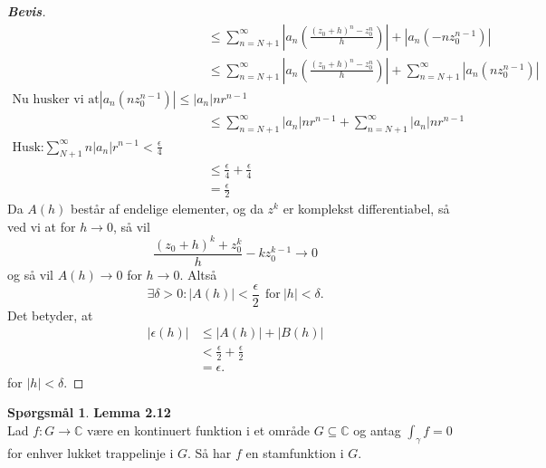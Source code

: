 \documentclass[10pt,a4paper]{article}
\theoremstyle{definition}
\newtheorem{Prob}{Spørgsmål}
\begin{document}
\begin{proof}[\textbf{Bevis}]
\begin{align*}
&\leq \sum\limits_{n=N+1}^\infty \left| a_n (\frac{(z_0 + h)^n - z_0^n}{h}) \right| + \left| a_n (- n z_0^{n-1}) \right| \\
&\leq \sum\limits_{n=N+1}^\infty \left| a_n (\frac{(z_0 + h)^n - z_0^n}{h}) \right| + \sum\limits_{n=N+1}^\infty \left| a_n ( n z_0^{n-1}) \right| \\
\text{Nu husker vi at} \left| a_n ( n z_0^{n-1}) \right| \leq \left| a_n \right| n r^{n-1} \\
&\leq \sum\limits_{n=N+1}^\infty \vert a_n \vert n r^{n-1} + \sum\limits_{n=N+1}^\infty \left| a_n \right| n r^{n-1} \\
\text{Husk:} \sum\limits_{N + 1}^\infty n \left| a_n \right| r^{n-1} < \frac{\epsilon}{4} \\
&\leq \frac{\epsilon}{4} + \frac{\epsilon}{4} \\
&= \frac{\epsilon}{2}
\end{align*}
Da $A(h)$ består af endelige elementer, og da $z^k$ er komplekst differentiabel, så ved vi at for $h \rightarrow 0$, så vil
$$ \frac{(z_0 + h)^k + z_0^k}{h} - k z_0^{k-1} \rightarrow 0$$
og så vil $A(h) \rightarrow 0$ for $h \rightarrow 0$. Altså
$$ \exists \delta > 0 : \left| A(h) \right| < \frac{\epsilon}{2} \ \ \text{for} \ \left| h \right| < \delta.$$
Det betyder, at
\begin{align*}
\left| \epsilon (h) \right| &\leq \left| A(h) \right| + \left| B(h) \right| \\
&< \frac{\epsilon}{2} + \frac{\epsilon}{2} \\
&= \epsilon.
\end{align*}
for $\left| h \right| < \delta$.
\end{proof}









\newpage
\begin{Prob}{\textbf{Lemma 2.12}} \\

Lad $f: G \rightarrow \mathbb{C}$ være en kontinuert funktion i et område $G \subseteq \mathbb{C}$ og antag $\int_\gamma f= 0$ for enhver lukket trappelinje i $G$. Så har $f$ en stamfunktion i $G$.
\end{Prob}
\end{document}
